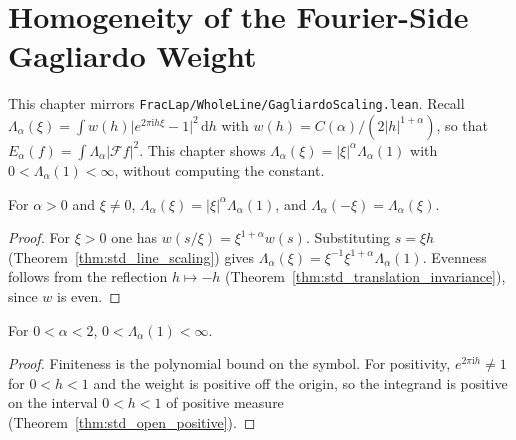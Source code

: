 \chapter{Homogeneity of the Fourier-Side Gagliardo Weight}

This chapter mirrors \texttt{FracLap/WholeLine/GagliardoScaling.lean}. Recall $\Lambda_\alpha(\xi) = \int w(h) \lvert e^{2\pi \mathrm{i} h \xi} - 1 \rvert^2\, \mathrm{d}h$ with $w(h) = C(\alpha) / (2 \lvert h \rvert^{1+\alpha})$, so that $E_\alpha(f) = \int \Lambda_\alpha \lvert \mathcal{F} f \rvert^2$. This chapter shows $\Lambda_\alpha(\xi) = \lvert \xi \rvert^\alpha \Lambda_\alpha(1)$ with $0 < \Lambda_\alpha(1) < \infty$, without computing the constant.

\begin{theorem}\label{thm:gagliardo_symbol_homogeneous}
\leanok
For $\alpha > 0$ and $\xi \ne 0$, $\Lambda_\alpha(\xi) = \lvert \xi \rvert^\alpha \Lambda_\alpha(1)$, and $\Lambda_\alpha(-\xi) = \Lambda_\alpha(\xi)$.
\end{theorem}

\begin{proof}
\leanok
For $\xi > 0$ one has $w(s/\xi) = \xi^{1+\alpha} w(s)$. Substituting $s = \xi h$ (Theorem~\ref{thm:std_line_scaling}) gives $\Lambda_\alpha(\xi) = \xi^{-1} \xi^{1+\alpha} \Lambda_\alpha(1)$. Evenness follows from the reflection $h \mapsto -h$ (Theorem~\ref{thm:std_translation_invariance}), since $w$ is even.
\end{proof}

\begin{theorem}\label{thm:gagliardo_symbol_unit}
\leanok
For $0 < \alpha < 2$, $0 < \Lambda_\alpha(1) < \infty$.
\end{theorem}

\begin{proof}
\leanok
Finiteness is the polynomial bound on the symbol. For positivity, $e^{2\pi \mathrm{i} h} \ne 1$ for $0 < h < 1$ and the weight is positive off the origin, so the integrand is positive on the interval $0 < h < 1$ of positive measure (Theorem~\ref{thm:std_open_positive}).
\end{proof}
